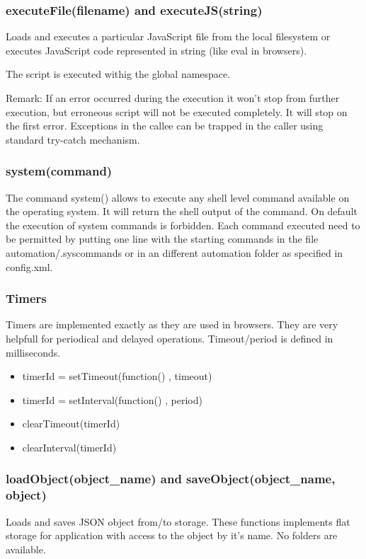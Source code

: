 \subsubsection{executeFile(filename) and executeJS(string)}

Loads and executes a particular JavaScript file from the local filesystem or executes JavaScript code represented in string (like eval in browsers).

The script is executed withig the global namespace.

Remark: If an error occurred during the execution it won't stop from further execution, but erroneous script will not be executed completely. It will stop on the first error.
Exceptions in the callee can be trapped in the caller using standard try-catch mechanism.

\subsubsection{system(command)}

The command system() allows to execute any shell level command available on the operating 
system. It will return the shell output of the command.  On default the execution of 
system commands is forbidden. Each command executed need to be permitted by putting one 
line with the starting commands in the file automation/.syscommands or in an different 
automation folder as specified in config.xml.

\subsubsection{Timers}
Timers are implemented exactly as they are used in browsers. They are very helpfull for periodical and delayed operations. Timeout/period is defined in milliseconds.
\begin{itemize}
\item timerId = setTimeout(function() { }, timeout)
\item timerId = setInterval(function() { }, period)
\item clearTimeout(timerId)
\item clearInterval(timerId)
\end{itemize}

\subsubsection{loadObject(object\_name) and saveObject(object\_name, object)}
Loads and saves JSON object from/to storage. These functions implements flat storage for application with access to the object by it's name. No folders are available.

